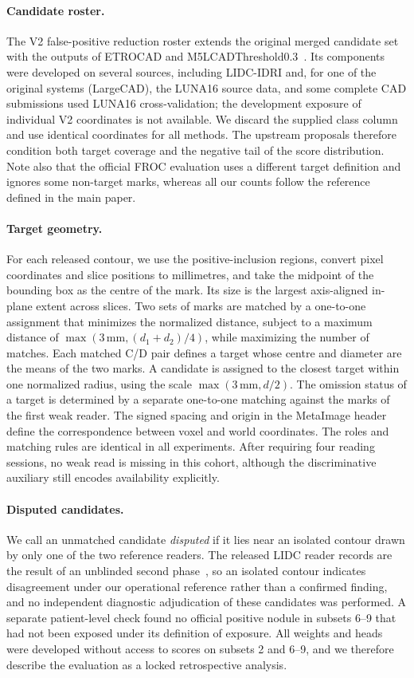 \paragraph{Candidate roster.}
The V2 false-positive reduction roster extends the original merged candidate set with the outputs of ETROCAD and M5LCADThreshold0.3~\cite{setio2017,luna16v2}. Its components were developed on several sources, including LIDC-IDRI and, for one of the original systems (LargeCAD), the LUNA16 source data, and some complete CAD submissions used LUNA16 cross-validation; the development exposure of individual V2 coordinates is not available. We discard the supplied class column and use identical coordinates for all methods. The upstream proposals therefore condition both target coverage and the negative tail of the score distribution. Note also that the official FROC evaluation uses a different target definition and ignores some non-target marks, whereas all our counts follow the reference defined in the main paper.

\paragraph{Target geometry.}
For each released contour, we use the positive-inclusion regions, convert pixel coordinates and slice positions to millimetres, and take the midpoint of the bounding box as the centre of the mark. Its size is the largest axis-aligned in-plane extent across slices. Two sets of marks are matched by a one-to-one assignment that minimizes the normalized distance, subject to a maximum distance of $\max(3\,\mathrm{mm},(d_1+d_2)/4)$, while maximizing the number of matches. Each matched C/D pair defines a target whose centre and diameter are the means of the two marks. A candidate is assigned to the closest target within one normalized radius, using the scale $\max(3\,\mathrm{mm},d/2)$. The omission status of a target is determined by a separate one-to-one matching against the marks of the first weak reader. The signed spacing and origin in the MetaImage header define the correspondence between voxel and world coordinates. The roles and matching rules are identical in all experiments. After requiring four reading sessions, no weak read is missing in this cohort, although the discriminative auxiliary still encodes availability explicitly.

\paragraph{Disputed candidates.}
We call an unmatched candidate \emph{disputed} if it lies near an isolated contour drawn by only one of the two reference readers. The released LIDC reader records are the result of an unblinded second phase~\cite{armato2011}, so an isolated contour indicates disagreement under our operational reference rather than a confirmed finding, and no independent diagnostic adjudication of these candidates was performed. A separate patient-level check found no official positive nodule in subsets 6--9 that had not been exposed under its definition of exposure. All weights and heads were developed without access to scores on subsets 2 and 6--9, and we therefore describe the evaluation as a locked retrospective analysis.

